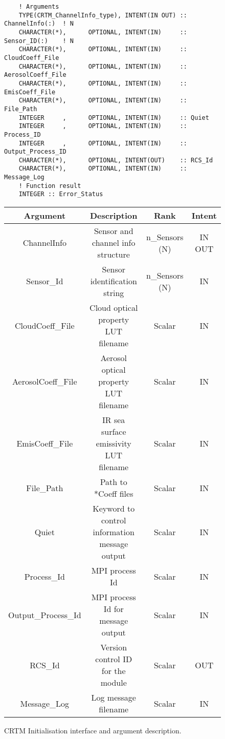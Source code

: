 \begin{figure}[htp]
{\begin{minipage}[b]{6.5in}
\begin{ttfamily}
\begin{verbatim}
    ! Arguments
    TYPE(CRTM_ChannelInfo_type), INTENT(IN OUT) :: ChannelInfo(:)  ! N
    CHARACTER(*),      OPTIONAL, INTENT(IN)     :: Sensor_ID(:)    ! N
    CHARACTER(*),      OPTIONAL, INTENT(IN)     :: CloudCoeff_File
    CHARACTER(*),      OPTIONAL, INTENT(IN)     :: AerosolCoeff_File
    CHARACTER(*),      OPTIONAL, INTENT(IN)     :: EmisCoeff_File
    CHARACTER(*),      OPTIONAL, INTENT(IN)     :: File_Path
    INTEGER     ,      OPTIONAL, INTENT(IN)     :: Quiet
    INTEGER     ,      OPTIONAL, INTENT(IN)     :: Process_ID
    INTEGER     ,      OPTIONAL, INTENT(IN)     :: Output_Process_ID
    CHARACTER(*),      OPTIONAL, INTENT(OUT)    :: RCS_Id
    CHARACTER(*),      OPTIONAL, INTENT(IN)     :: Message_Log
    ! Function result
    INTEGER :: Error_Status
      \end{verbatim}
    \end{ttfamily}
    \centering
    \begin{tabular}{c|c|c|c}
      \textbf{Argument} & \textbf{Description}                     & \textbf{Rank}   & \textbf{Intent} \\
      \hline\hline
      ChannelInfo        & Sensor and channel info structure       & n\_Sensors (N)  & IN OUT      \\
      \hline
      Sensor\_Id         & Sensor identification string            & n\_Sensors (N)  & IN      \\
      \hline
      CloudCoeff\_File   & Cloud optical property LUT filename     & Scalar          & IN      \\
      \hline
      AerosolCoeff\_File & Aerosol optical property LUT filename   & Scalar          & IN      \\
      \hline
      EmisCoeff\_File    & IR sea surface emissivity LUT filename  & Scalar          & IN      \\
      \hline
      File\_Path         & Path to *Coeff files                    & Scalar          & IN      \\
      \hline
      Quiet              & Keyword to control information message output & Scalar         & IN      \\
      \hline
      Process\_Id        & MPI process Id                          & Scalar          & IN      \\
      \hline
      Output\_Process\_Id & MPI process Id for message output      & Scalar          & IN      \\
      \hline
      RCS\_Id            & Version control ID for the module      & Scalar           & OUT     \\
      \hline
      Message\_Log       & Log message filename                   & Scalar           & IN      \\
    \end{tabular}
  \end{minipage}
  }
  \caption{CRTM Initialisation interface and argument description.}
  \label{fig:init_interface}
\end{figure}

